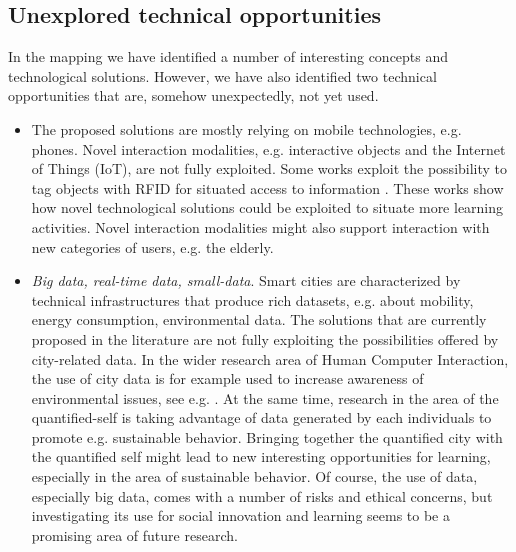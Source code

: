\subsection*{Unexplored technical opportunities}
In the mapping we have identified a number of interesting concepts and technological solutions. However, we have also identified two technical opportunities that are, somehow unexpectedly, not yet used.
\begin{itemize}
\item The proposed solutions are mostly relying on mobile technologies, e.g. phones. Novel interaction modalities, e.g. interactive objects and the Internet of Things (IoT), are not fully exploited. Some works exploit the possibility to tag objects with RFID for situated access to information \cite{kashtan_outdoors_2013}. These works show how novel technological solutions could be exploited to situate more learning activities. Novel interaction modalities might also support interaction with new categories of users, e.g. the elderly.
\item \textit{Big data, real-time data, small-data}. Smart cities are characterized by technical infrastructures that produce rich datasets, e.g. about mobility, energy consumption, environmental data. The solutions that are currently proposed in the literature are not fully exploiting the possibilities offered by city-related data. In the wider research area of Human Computer Interaction, the use of city data is for example used to increase awareness of environmental issues, see e.g. \cite{dourish_hci_2010}. At the same time, research in the area of the quantified-self is taking advantage of data generated by each individuals to promote e.g. sustainable behavior. Bringing together the quantified city with the quantified self might lead to new interesting opportunities for learning, especially in the area of sustainable behavior. Of course, the use of data, especially big data, comes with a number of risks and ethical concerns, but investigating its use for social innovation and learning seems to be a promising area of future research.
\end{itemize}
